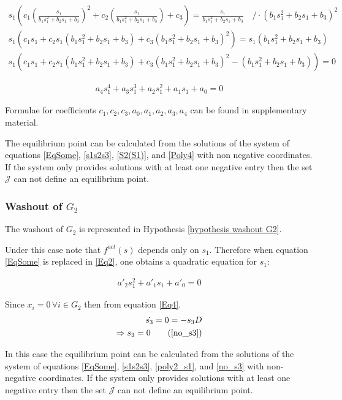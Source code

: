 \documentclass[3p,times]{article}
\begin{document}
\begin{align}
s_1\left( c_1\left( \frac{s_1}{b_1s_1^2+b_2s_1+b_3} \right)^2 + c_2\left( \frac{s_1}{b_1s_1^2+b_2s_1+b_3} \right) + c_3 \right) =  \frac{s_1}{b_1s_1^2+b_2s_1+b_3}  \quad /\cdot  \left(b_1s_1^2+b_2s_1+b_3\right)^2\\
s_1\left( c_1s_1 + c_2s_1\left(b_1s_1^2+b_2s_1+b_3\right)  + c_3\left(b_1s_1^2+b_2s_1+b_3\right)^2 \right) =  s_1\left(b_1s_1^2+b_2s_1+b_3\right) \\
s_1\left( c_1s_1 + c_2s_1\left(b_1s_1^2+b_2s_1+b_3\right)  + c_3\left(b_1s_1^2+b_2s_1+b_3\right)^2 - \left(b_1s_1^2+b_2s_1+b_3\right) \right) = 0 
\end{align} 

\begin{align}
\label{Poly4} a_4s_1^4+a_3s_1^3+a_2s_1^2+a_1s_1+a_0 = 0
\end{align}


Formulae for coefficients $c_1, c_2, c_3, a_0, a_1, a_2, a_3, a_4$ can be found in supplementary material. 

The equilibrium point can be calculated from the solutions of the system of equations \eqref{EqSome}, \eqref{s1s2s3}, \eqref{S2(S1)}, and \eqref{Poly4} with non negative coordinates. If the system only provides solutions with at least one negative entry then the set $\mathcal{J}$ can not define an equilibrium point.


\subsubsection{Washout of $G_2$}

The washout of $G_2$ is represented in Hypothesis \ref{hypothesis washout G2}. 

Under this case note that $f^{act}(s)$ depends only on $s_1$. Therefore when equation \eqref{EqSome} is replaced in \eqref{Eq2}, one obtains a quadratic equation for $s_1$:

\begin{align}
\label{poly2_s1} a'_2 s_1^2 + a'_1s_1 + a'_0 = 0
\end{align}


Since $x_i = 0 \, \forall i \in G_2$ then from equation \eqref{Eq4}.
\begin{align}
\dot{s_3} = 0 = -s_3D \\
\Rightarrow s_3 = 0 \tag{\ref{no_s3}}
\end{align}

In this case the equilibrium point can be calculated from the solutions of the system of equations \eqref{EqSome}, \eqref{s1s2s3}, \eqref{poly2_s1}, and \eqref{no_s3} with non-negative coordinates. If the system only provides solutions with at least one negative entry then the set $\mathcal{J}$ can not define an equilibrium point.
\end{document}
